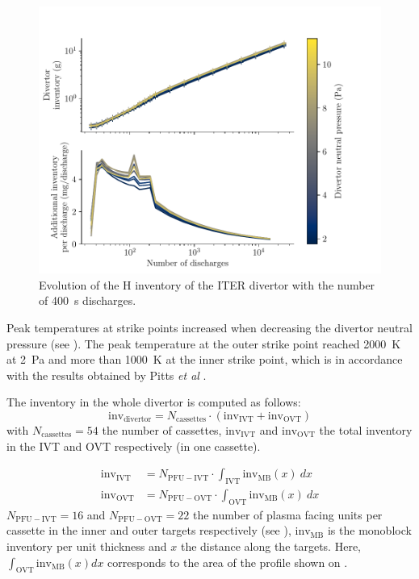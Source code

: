 \begin{figure}[h!]
    \centering
    \includegraphics[width=\linewidth]{Figures/Chapter4/ITER/inventory_vs_time.pdf}
    \caption{Evolution of the H inventory of the ITER divertor with the number of \SI{400}{s} discharges.}
\end{figure}


Peak temperatures at strike points increased when decreasing the divertor neutral pressure (see ).
The peak temperature at the outer strike point reached \SI{2000}{K} at \SI{2}{Pa} and more than \SI{1000}{K} at the inner strike point, which is in accordance with the results obtained by Pitts \textit{et al} .

The inventory in the whole divertor is computed as follows:
\begin{equation}
    \mathrm{inv_{divertor}} = N_\mathrm{cassettes} \cdot (\mathrm{inv_{IVT}} + \mathrm{inv_{OVT}})
\end{equation}
with $N_\mathrm{cassettes}=54$ the number of cassettes, $\mathrm{inv_{IVT}}$ and $\mathrm{inv_{OVT}}$ the total inventory in the IVT and OVT respectively (in one cassette).

\begin{align}
    \mathrm{inv_{IVT}} &= N_\mathrm{PFU-IVT} \cdot \int_\mathrm{IVT} \mathrm{inv_{MB}}(x)\: dx \\
    \mathrm{inv_{OVT}} &= N_\mathrm{PFU-OVT} \cdot \int_\mathrm{OVT} \mathrm{inv_{MB}}(x)\: dx
\end{align}
$N_\mathrm{PFU-IVT}=16$ and $N_\mathrm{PFU-OVT}=22$ the number of plasma facing units per cassette in the inner and outer targets respectively (see ), $\mathrm{inv_{MB}}$ is the monoblock inventory per unit thickness and $x$ the distance along the targets.
Here, $\int_\mathrm{OVT} \mathrm{inv_{MB}}(x) dx$ corresponds to the area of the profile shown on .

